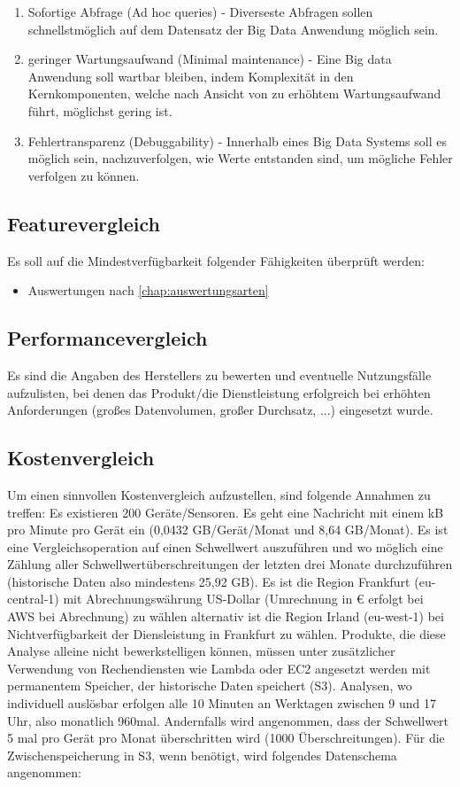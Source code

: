 \begin{enumerate}
\item Sofortige Abfrage (Ad hoc queries) - 
Diverseste Abfragen sollen schnellstmöglich auf dem Datensatz der Big Data Anwendung möglich sein.

\item geringer Wartungsaufwand (Minimal maintenance) - 
Eine Big data Anwendung soll wartbar bleiben, indem Komplexität in den Kernkomponenten, welche nach Ansicht von \citeauthor{Marz.2015} zu erhöhtem Wartungsaufwand führt, möglichst gering ist.

\item Fehlertransparenz (Debuggability) - 
Innerhalb eines Big Data Systems soll es möglich sein, nachzuverfolgen, wie Werte entstanden sind, um mögliche Fehler verfolgen zu können.
\end{enumerate}


\subsection{Featurevergleich}
Es soll auf die Mindestverfügbarkeit folgender Fähigkeiten überprüft werden:
\begin{itemize}
\item Auswertungen nach \autoref{chap:auswertungsarten}
\end{itemize}

\subsection{Performancevergleich}
Es sind die Angaben des Herstellers zu bewerten und eventuelle Nutzungsfälle aufzulisten, bei denen das Produkt/die Dienstleistung erfolgreich bei erhöhten Anforderungen (großes Datenvolumen, großer Durchsatz, ...) eingesetzt wurde.

\subsection{Kostenvergleich}
Um einen sinnvollen Kostenvergleich aufzustellen, sind folgende Annahmen zu treffen:
Es existieren 200 Geräte/Sensoren. Es geht eine Nachricht mit einem kB pro Minute pro Gerät ein (0,0432 GB/Gerät/Monat und 8,64 GB/Monat).
Es ist eine Vergleichsoperation auf einen Schwellwert auszuführen und wo möglich eine Zählung aller Schwellwertüberschreitungen der letzten drei Monate durchzuführen (historische Daten also mindestens 25,92 GB).  Es ist die Region Frankfurt (eu-central-1) mit Abrechnungswährung US-Dollar (Umrechnung in € erfolgt bei \ac{AWS} bei Abrechnung) zu wählen alternativ ist die Region Irland (eu-west-1) bei Nichtverfügbarkeit der Diensleistung in Frankfurt zu wählen. Produkte, die diese Analyse alleine nicht bewerkstelligen können, müssen unter zusätzlicher Verwendung von Rechendiensten wie Lambda oder \ac{EC2} angesetzt werden mit permanentem Speicher, der historische Daten speichert (\ac{S3}). Analysen, wo individuell auslösbar erfolgen alle 10 Minuten an Werktagen zwischen 9 und 17 Uhr, also monatlich 960mal. Andernfalls wird angenommen, dass der Schwellwert 5 mal pro Gerät pro Monat überschritten wird (1000 Überschreitungen).
Für die Zwischenspeicherung in \ac{S3}, wenn benötigt, wird folgendes Datenschema angenommen:

